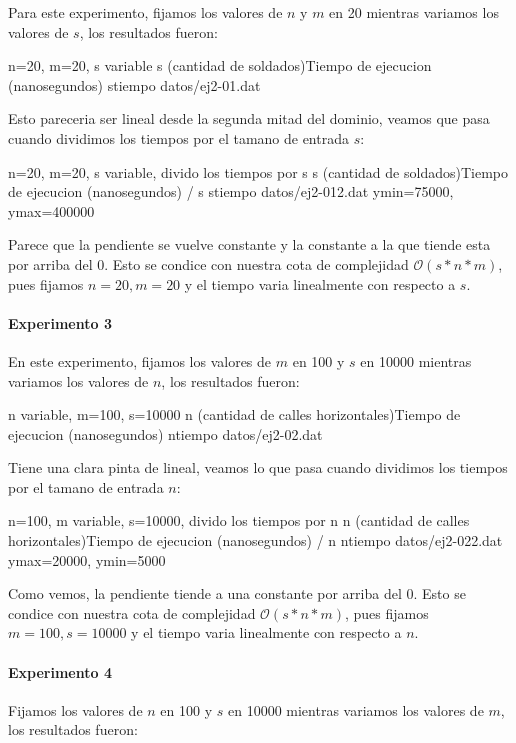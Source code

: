 Para este experimento, fijamos los valores de $n$ y $m$ en 20 mientras variamos los valores de $s$, los resultados fueron:

\graficarDatos
{n=20, m=20, s variable}
{s (cantidad de soldados)}{Tiempo de ejecucion (nanosegundos)}
{s}{tiempo}
{datos/ej2-01.dat}

Esto pareceria ser lineal desde la segunda mitad del dominio, veamos que pasa cuando dividimos los tiempos por el tamano de entrada $s$:

\graficarDatosPlus
{n=20, m=20, s variable, divido los tiempos por s}
{s (cantidad de soldados)}{Tiempo de ejecucion (nanosegundos) / s}
{s}{tiempo}
{datos/ej2-012.dat}
{ymin=75000, ymax=400000}

Parece que la pendiente se vuelve constante y la constante a la que tiende esta por arriba del 0. Esto se condice con nuestra cota de complejidad $\mathcal{O}(s*n*m)$, pues fijamos $n=20, m=20$ y el tiempo varia linealmente con respecto a $s$.

\paragraph{Experimento 3}

En este experimento, fijamos los valores de $m$ en 100 y $s$ en 10000 mientras variamos los valores de $n$, los resultados fueron:

\graficarDatos
{n variable, m=100, s=10000}
{n (cantidad de calles horizontales)}{Tiempo de ejecucion (nanosegundos)}
{n}{tiempo}
{datos/ej2-02.dat}

Tiene una clara pinta de lineal, veamos lo que pasa cuando dividimos los tiempos por el tamano de entrada $n$:

\graficarDatosPlus
{n=100, m variable, s=10000, divido los tiempos por n}
{n (cantidad de calles horizontales)}{Tiempo de ejecucion (nanosegundos) / n}
{n}{tiempo}
{datos/ej2-022.dat}
{ymax=20000, ymin=5000}

Como vemos, la pendiente tiende a una constante por arriba del 0. Esto se condice con nuestra cota de complejidad $\mathcal{O}(s*n*m)$, pues fijamos $m=100, s=10000$ y el tiempo varia linealmente con respecto a $n$.

\paragraph{Experimento 4}

Fijamos los valores de $n$ en 100 y $s$ en 10000 mientras variamos los valores de $m$, los resultados fueron:


